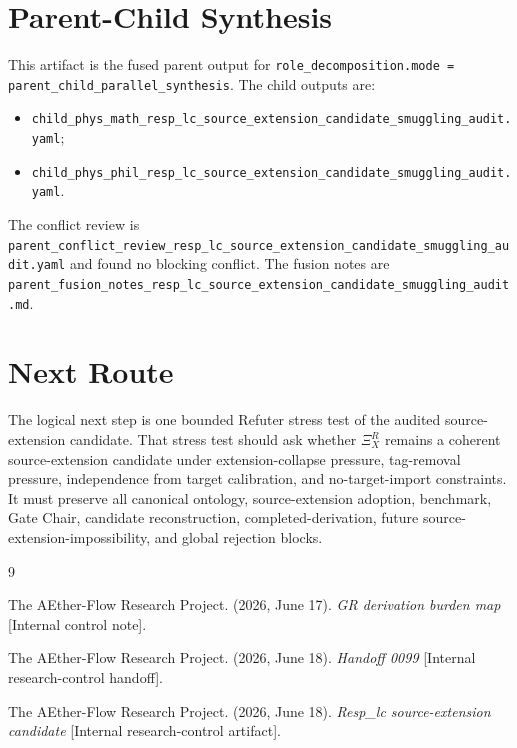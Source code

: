 \documentclass[11pt]{article}
\newcommand{\XiR}{\Xi_X^R}
\begin{document}
\section{Parent-Child Synthesis}

This artifact is the fused parent output for
\texttt{role\_decomposition.mode = parent\_child\_parallel\_synthesis}.
The child outputs are:
\begin{itemize}
  \item \texttt{child\_phys\_math\_resp\_lc\_source\_extension\_candidate\_smuggling\_audit.yaml};
  \item \texttt{child\_phys\_phil\_resp\_lc\_source\_extension\_candidate\_smuggling\_audit.yaml}.
\end{itemize}
The conflict review is
\texttt{parent\_conflict\_review\_resp\_lc\_source\_extension\_candidate\_smuggling\_audit.yaml}
and found no blocking conflict. The fusion notes are
\texttt{parent\_fusion\_notes\_resp\_lc\_source\_extension\_candidate\_smuggling\_audit.md}.

\section{Next Route}

The logical next step is one bounded Refuter stress test of the audited
source-extension candidate. That stress test should ask whether
\(\XiR\) remains a coherent source-extension candidate under
extension-collapse pressure, tag-removal pressure, independence from
target calibration, and no-target-import constraints. It must preserve
all canonical ontology, source-extension adoption, benchmark, Gate
Chair, candidate reconstruction, completed-derivation, future
source-extension-impossibility, and global rejection blocks.

\begin{thebibliography}{9}

The AEther-Flow Research Project. (2026, June 17). \emph{GR derivation
burden map} [Internal control note].

The AEther-Flow Research Project. (2026, June 18). \emph{Handoff 0099}
[Internal research-control handoff].

The AEther-Flow Research Project. (2026, June 18). \emph{Resp\_lc
source-extension candidate} [Internal research-control artifact].

\end{thebibliography}
\end{document}
